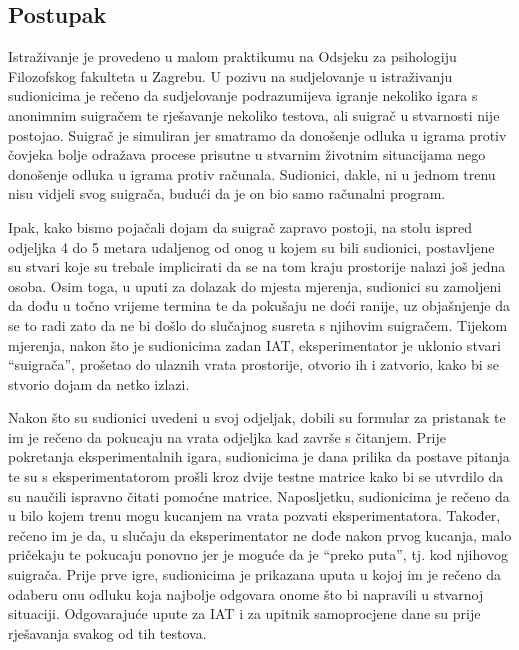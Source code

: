 \documentclass[a4paper, 12pt]{report}
\begin{document}
\subsection{Postupak}

Istraživanje je provedeno u malom praktikumu na Odsjeku za psihologiju
Filozofskog fakulteta u Zagrebu.
U pozivu na sudjelovanje u istraživanju sudionicima je rečeno da sudjelovanje 
podrazumijeva igranje nekoliko igara s anonimnim suigračem te
rješavanje nekoliko testova, ali suigrač u stvarnosti nije postojao. 
Suigrač je simuliran jer smatramo da donošenje odluka u igrama protiv čovjeka
bolje odražava procese prisutne u stvarnim životnim situacijama nego donošenje
odluka u igrama protiv računala. Sudionici, dakle, ni u jednom trenu nisu
vidjeli svog suigrača, budući da je on bio samo računalni program.

Ipak, kako bismo pojačali
dojam da suigrač zapravo postoji, na stolu ispred odjeljka
4 do 5 metara udaljenog od onog u kojem su bili sudionici, postavljene su stvari
koje su trebale implicirati da se na tom kraju prostorije nalazi još jedna
osoba. 
Osim toga, u uputi za dolazak do
mjesta mjerenja, sudionici su zamoljeni da dođu u točno vrijeme termina te da
pokušaju ne doći ranije, uz objašnjenje da se to radi zato da ne bi došlo do
slučajnog susreta s njihovim suigračem. Tijekom mjerenja, nakon što je
sudionicima zadan  IAT, eksperimentator je uklonio stvari \enquote{suigrača},  
prošetao do ulaznih vrata prostorije, otvorio ih i zatvorio, kako bi se stvorio
dojam da netko izlazi.

Nakon što su sudionici uvedeni
u svoj odjeljak, dobili su formular za pristanak te im je rečeno da
pokucaju na vrata odjeljka kad završe s čitanjem. 
Prije pokretanja eksperimentalnih igara, sudionicima je dana prilika da postave
pitanja te su s eksperimentatorom prošli kroz dvije testne matrice
kako bi se utvrdilo
da su  naučili ispravno čitati pomoćne matrice. Naposljetku,
sudionicima je rečeno da  u bilo kojem trenu mogu
kucanjem na vrata pozvati eksperimentatora. Također,
rečeno im je da, u slučaju da eksperimentator ne dođe nakon prvog kucanja, malo pričekaju te
pokucaju ponovno jer je moguće da je \enquote{preko puta}, tj. kod njihovog
suigrača.
Prije prve igre, sudionicima je prikazana uputa u kojoj im je rečeno da odaberu
onu odluku koja najbolje odgovara onome što bi napravili u stvarnoj situaciji.
Odgovarajuće upute za IAT i za upitnik samoprocjene dane su prije rješavanja
svakog od tih testova.
\end{document}
